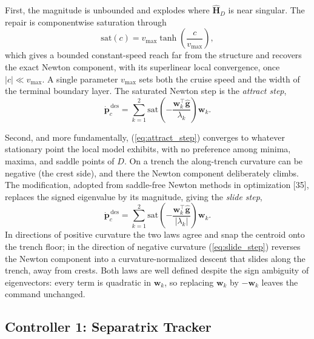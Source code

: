 \documentclass[lettersize,journal]{IEEEtran}
\begin{document}
First, the magnitude is unbounded and explodes where
$\hat{\mathbf{H}}_D$ is near singular. The repair is componentwise
saturation through
\begin{equation}
    \mathrm{sat}(c) = v_{\max} \tanh\!\left(\frac{c}{v_{\max}}\right),
    \label{eq:sat}
\end{equation}
which gives a bounded constant-speed reach far from the structure and
recovers the exact Newton component, with its superlinear local
convergence, once $|c| \ll v_{\max}$. A single parameter $v_{\max}$
sets both the cruise speed and the width of the terminal boundary
layer. The saturated Newton step is the \emph{attract step},
\begin{equation}
    \dot{\mathbf{p}}_c^{\,\text{des}} = \sum_{k=1}^{2}
    \mathrm{sat}\!\left(-\frac{\mathbf{w}_k^\top
    \hat{\mathbf{g}}}{\lambda_k}\right)\mathbf{w}_k.
    \label{eq:attract_step}
\end{equation}

Second, and more fundamentally, (\ref{eq:attract_step}) converges to
whatever stationary point the local model exhibits, with no preference
among minima, maxima, and saddle points of $D$. On a trench the
along-trench curvature can be negative (the crest side), and there the
Newton component deliberately climbs. The modification, adopted from
saddle-free Newton methods in optimization [35], replaces the signed
eigenvalue by its magnitude, giving the \emph{slide step},
\begin{equation}
    \dot{\mathbf{p}}_c^{\,\text{des}} = \sum_{k=1}^{2}
    \mathrm{sat}\!\left(-\frac{\mathbf{w}_k^\top
    \hat{\mathbf{g}}}{|\lambda_k|}\right)\mathbf{w}_k.
    \label{eq:slide_step}
\end{equation}
In directions of positive curvature the two laws agree and snap the
centroid onto the trench floor; in the direction of negative curvature
(\ref{eq:slide_step}) reverses the Newton component into a
curvature-normalized descent that slides along the trench, away from
crests. Both laws are well defined despite the sign ambiguity of
eigenvectors: every term is quadratic in $\mathbf{w}_k$, so replacing
$\mathbf{w}_k$ by $-\mathbf{w}_k$ leaves the command unchanged.

\subsection{Controller 1: Separatrix Tracker}
\label{sec:sep_controller}
\end{document}
